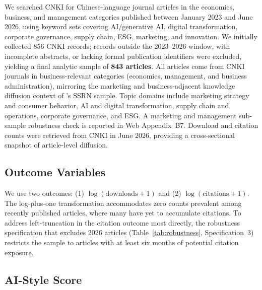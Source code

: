 \documentclass[12pt,a4paper]{article}
\begin{document}
We searched CNKI for Chinese-language journal articles in the
economics, business, and management categories published between
January 2023 and June 2026, using keyword sets covering
AI/generative AI, digital transformation, corporate governance,
supply chain, ESG, marketing, and innovation.
We initially collected 856 CNKI records; records outside the 2023--2026
window, with incomplete abstracts, or lacking formal publication
identifiers were excluded, yielding a final analytic sample of
\textbf{843 articles}.
All articles come from CNKI journals in business-relevant categories
(economics, management, and business administration), mirroring the
marketing and business-adjacent knowledge diffusion context of
\citet{JoLi2026}'s SSRN sample.
Topic domains include marketing strategy and consumer behavior,
AI and digital transformation, supply chain and operations, corporate
governance, and ESG.
A marketing and management sub-sample robustness check is reported in
Web Appendix~B7.
Download and citation counts were retrieved from CNKI in June 2026,
providing a cross-sectional snapshot of article-level diffusion.

\subsection{Outcome Variables}

We use two outcomes: (1) $\log(\text{downloads}+1)$ and
(2) $\log(\text{citations}+1)$.
The log-plus-one transformation accommodates zero counts prevalent
among recently published articles, where many have yet to accumulate
citations.
To address left-truncation in the citation outcome most directly,
the robustness specification that excludes 2026 articles
(Table~\ref{tab:robustness}, Specification~3) restricts the sample
to articles with at least six months of potential citation exposure.

\subsection{AI-Style Score}
\end{document}
